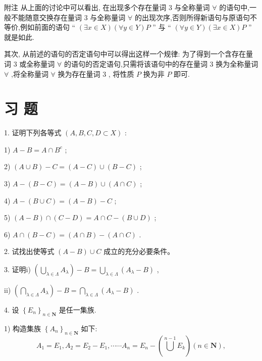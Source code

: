附注 从上面的讨论中可以看出, 在出现多个存在量词 3 与全称量词 $\forall$ 的语句中,一般不能随意交换存在量词 3 与全称量词 $\forall$ 的出现次序,否则所得新语句与原语句不等价,例如前面的语句 “ $\left( {\exists x \in  X}\right) \left( {\forall y \in  Y}\right) P$ ” 与 “ $\left( {\forall y \in  Y}\right) \left( {\exists x \in  X}\right) P$ ” 就是如此.

其次, 从前述的语句的否定语句中可以得出这样一个规律: 为了得到一个含存在量词 3 或全称量词 $\forall$ 的语句的否定语句,只需将该语句中的存在量词 3 换为全称量词 $\forall$ ,将全称量词 $\forall$ 换为存在量词 3 , 将性质 $P$ 换为非 $P$ 即可.

\section*{习 题}

1. 证明下列各等式 $\left( {A,B,C,D \subset  X}\right)$ :

1) $A - B = A \cap  {B}^{c}$ ;

2) $\left( {A \cup  B}\right)  - C = \left( {A - C}\right)  \cup  \left( {B - C}\right)$ ;

3) $A - \left( {B - C}\right)  = \left( {A - B}\right)  \cup  \left( {A \cap  C}\right)$ ; 

4) $A - \left( {B \cup  C}\right)  = \left( {A - B}\right)  - C$ ;

5) $\left( {A - B}\right)  \cap  \left( {C - D}\right)  = A \cap  C - \left( {B \cup  D}\right)$ ;

6) $A \cap  \left( {B - C}\right)  = \left( {A \cap  B}\right)  - \left( {A \cap  C}\right)$ . 

2. 试找出使等式 $\left( {A - B}\right)  \cup  C$ 成立的充分必要条件。


3. 证明i) $\left( {\mathop{\bigcup }\limits_{{\lambda  \in  \Lambda }}{A}_{\lambda }}\right)  - B = \mathop{\bigcup }\limits_{{\lambda  \in  \Lambda }}\left( {{A}_{\lambda } - B}\right)$ ,

ii) $\left( {\mathop{\bigcap }\limits_{{\lambda  \in  \Lambda }}{A}_{\lambda }}\right)  - B = \mathop{\bigcap }\limits_{{\lambda  \in  \Lambda }}\left( {{A}_{\lambda } - B}\right)$ .

4. 设 ${\left\{  {E}_{n}\right\}  }_{n \in  \mathbf{N}}$ 是任一集族.

1) 构造集族 ${\left\{  {A}_{n}\right\}  }_{n \in  \mathbf{N}}$ 如下:
$${A}_{1} = {E}_{1},{A}_{2} = {E}_{2} - {E}_{1},\cdots \cdots {A}_{n} = {E}_{n} - \left( {\mathop{\bigcup }\limits^{{n - 1}}{E}_{k}}\right) \left( {n \in  \mathbf{N}}\right) ,$$

